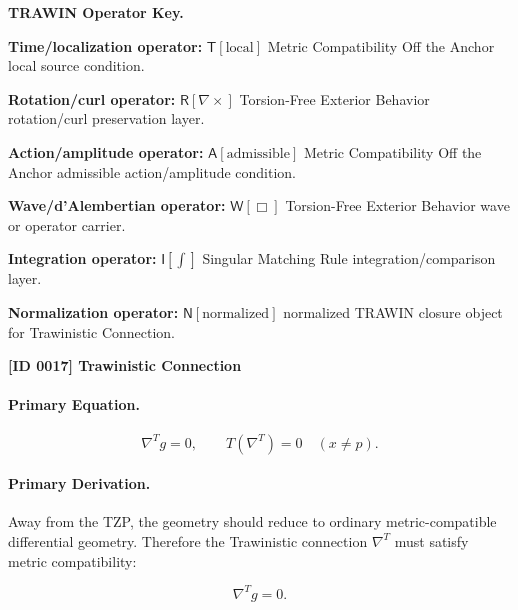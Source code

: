 \par\vspace{0.45\baselineskip}
\noindent\begin{minipage}[t]{\linewidth}
\begingroup
\small
\raggedright
\textbf{TRAWIN Operator Key.}\par
\noindent\textbf{Time/localization operator:} $\mathsf{T}\!\left[\mathrm{local}\right]$ Metric Compatibility Off the Anchor local source condition.\par
\noindent\textbf{Rotation/curl operator:} $\mathsf{R}\!\left[\nabla\times\right]$ Torsion-Free Exterior Behavior rotation/curl preservation layer.\par
\noindent\textbf{Action/amplitude operator:} $\mathsf{A}\!\left[\mathrm{admissible}\right]$ Metric Compatibility Off the Anchor admissible action/amplitude condition.\par
\noindent\textbf{Wave/d'Alembertian operator:} $\mathsf{W}\!\left[\Box\right]$ Torsion-Free Exterior Behavior wave or operator carrier.\par
\noindent\textbf{Integration operator:} $\mathsf{I}\!\left[\int\right]$ Singular Matching Rule integration/comparison layer.\par
\noindent\textbf{Normalization operator:} $\mathsf{N}\!\left[\mathrm{normalized}\right]$ normalized TRAWIN closure object for Trawinistic Connection.\par
\endgroup
\end{minipage}

\clearpage
\noindent\textbf{[ID 0017] Trawinistic Connection}\par
\vspace{0.35em}
\paragraph{Primary Equation.}
\begin{equation}
\nabla^{T}g=0,
\qquad
T(\nabla^{T})=0
\quad
(x\neq p).
\end{equation}

\paragraph{Primary Derivation.}
Away from the TZP, the geometry should reduce to ordinary metric-compatible differential geometry. Therefore the Trawinistic connection $\nabla^{T}$ must satisfy metric compatibility:

\begin{equation}
\nabla^{T}g=0 .
\end{equation}

